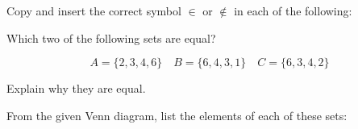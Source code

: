 \documentclass[12pt, a4paper, addpoints]{exam}
\begin{document}
\begin{questions}
Copy and insert the correct symbol $\in$ or $\notin$ in each of the following:
\begin{multicols}{5}
\end{multicols}


\question Which two of the following sets are equal?

\[
A = \{2, 3, 4, 6\} \quad B = \{6, 4, 3, 1\} \quad C = \{6, 3, 4, 2\}
\]

Explain why they are equal.




\question From the given Venn diagram, list the elements of each of these sets:

\begin{minipage}{0.5\textwidth}
\end{minipage}
\begin{minipage}{0.5\textwidth}
    \begin{center}
\end{center}
\end{minipage}
\end{questions}
\end{document}
